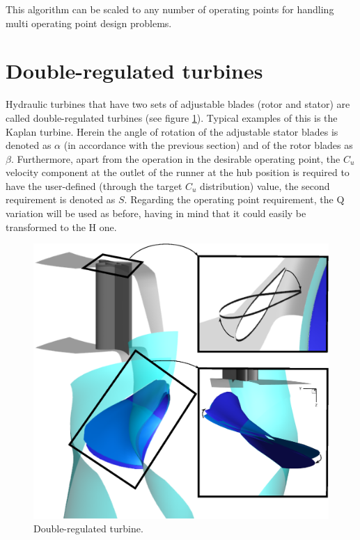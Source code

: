 This algorithm can be scaled to any number of operating points for handling multi operating point design problems.     

\section{Double-regulated turbines}

Hydraulic turbines that have two sets of adjustable blades (rotor and stator) are called double-regulated turbines (see figure \ref{double}). Typical examples of this is the Kaplan turbine.  
Herein the angle of rotation of the adjustable stator blades is denoted as $\alpha$ (in accordance with the previous section) and of the rotor blades as $\beta$. Furthermore, apart from the operation in the desirable operating point, the $C_u$ velocity component at the outlet of the runner at the hub position is required to have the user-defined (through the target $C_u$ distribution) value, the second requirement is denoted as $S$.     
Regarding the operating point requirement, the Q variation will be used as before, having in mind that it could easily be transformed to the H one.  

\begin{figure}[h!]
\centering
\includegraphics[width=.8\textwidth]{DOUBLE.eps}
\caption{Double-regulated turbine.}
\label{double}
\end{figure}


